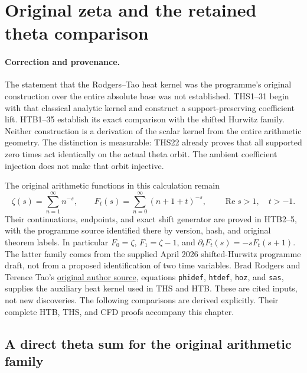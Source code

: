 \section{Original zeta and the retained theta comparison}
\label{sec:original-zeta-theta-correction}

\paragraph{Correction and provenance.}
The statement that the Rodgers--Tao heat kernel was the programme's
original construction over the entire absolute base was not established.
THS1--31 begin with that classical analytic kernel and construct a
support-preserving coefficient lift. HTB1--35 establish its exact
comparison with the shifted Hurwitz family. Neither construction is a
derivation of the scalar kernel from the entire arithmetic geometry.
The distinction is measurable: THS22 already proves that all supported
zero times act identically on the actual theta orbit. The ambient
coefficient injection does not make that orbit injective.

The original arithmetic functions in this calculation remain
\begin{equation}\tag{ZTC1}
 \zeta(s)=\sum_{n=1}^{\infty}n^{-s},\qquad
 F_t(s)=\sum_{n=0}^{\infty}(n+1+t)^{-s},
 \qquad \operatorname{Re}s>1,\quad t>-1.
\end{equation}
Their continuations, endpoints, and exact shift generator are proved in
HTB2--5, with the programme source identified there by version, hash,
and original theorem labels. In particular $F_0=\zeta$,
$F_1=\zeta-1$, and $\partial_tF_t(s)=-sF_t(s+1)$.
The latter family comes from the supplied April 2026 shifted-Hurwitz
programme draft, not from a proposed identification of two time variables.
Brad Rodgers and Terence Tao's
\href{https://arxiv.org/abs/1801.05914v5}{original author source},
equations \texttt{phidef}, \texttt{htdef}, \texttt{hoz}, and
\texttt{sas}, supplies the auxiliary heat kernel used in THS and HTB.
These are cited inputs, not new discoveries. The following comparisons
are derived explicitly. Their complete HTB, THS, and CFD proofs accompany
this chapter.

\subsection{A direct theta sum for the original arithmetic family}

